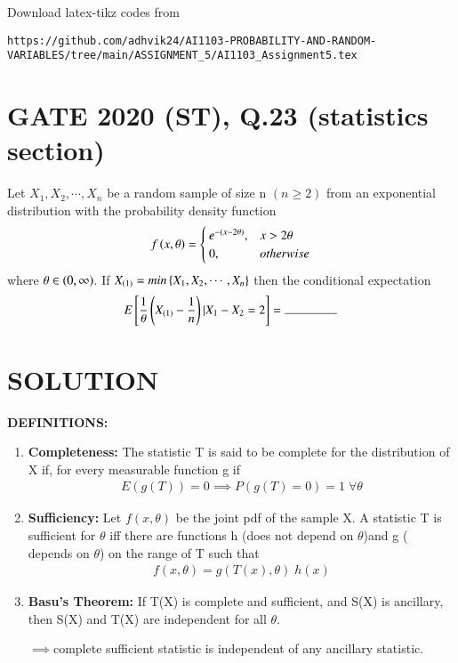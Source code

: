 \documentclass[journal,12pt,twocolumn]{IEEEtran}
\begin{document}
%
Download latex-tikz codes from 
%
\begin{lstlisting}
https://github.com/adhvik24/AI1103-PROBABILITY-AND-RANDOM-VARIABLES/tree/main/ASSIGNMENT_5/AI1103_Assignment5.tex
\end{lstlisting}
\section{GATE 2020 (ST), Q.23 (statistics section)}
Let $X_1,X_2,\cdots,X_n$ be a random sample of size n $(n\ge2)$ from an exponential distribution with the probability density function
\begin{align}
f\left({x,\theta}\right)=
\begin{cases}
e^{-(x-2\theta)}, & x>2\theta
\\
0, & otherwise
\end{cases}
\end{align}
where $\theta\in\left(0,\infty\right)$. If $X_{(1)}=min\left\{X_1,X_2,\cdots,X_n\right\}$ then the conditional expectation 
\begin{align}
     \nonumber   \mean{\frac{1}{\theta}\brak{X_{(1)}-\frac{1}{n}}|X_1-X_2=2}=\rule{1.5cm}{0.15mm}
\end{align}
\section{SOLUTION}
\textbf{DEFINITIONS:}
\begin{enumerate}
    \item \textbf{Completeness: }The statistic T is said to be complete for the distribution of X if, for every measurable function g
    if 
    \begin{align}
        E(g(T))=0\implies P(g(T)=0)=1\;\forall\theta
    \end{align}
    \item\textbf{Sufficiency: }
    Let $f(x,\theta)$ be the joint pdf of the sample X. A statistic T is sufficient for $\theta$ iff there are functions h (does not depend on $\theta$)and g ( depends on $\theta$) on the range of T such that
\begin{align}
    f(x,\theta)=g(T(x),\theta)\;h(x)
\end{align}
    \item\textbf{Basu's Theorem: }
    If T(X) is complete and sufficient, and S(X) is ancillary, then S(X) and T(X) are independent for all $\theta$.
    
    $\implies$complete sufficient statistic is independent of any ancillary statistic.
\end{enumerate}
\end{document}
